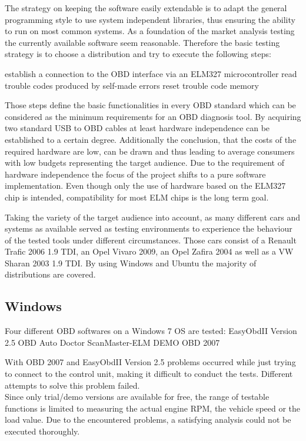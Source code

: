 The strategy on keeping the software easily extendable is to adapt the general programming style to use system independent libraries, thus 
ensuring the ability to run on most common systems. As a foundation of the market analysis testing the currently available software seem reasonable. 
Therefore the basic testing strategy is to choose a distribution and try to execute the following steps:

establish a connection to the OBD interface via an ELM327 microcontroller 
read trouble codes produced by self-made errors
reset trouble code memory

Those steps define the basic functionalities in every OBD standard which can be considered as the minimum requirements for an OBD diagnosis tool.
By acquiring two standard USB to OBD cables at least hardware independence can be established to a certain degree. Additionally the conclusion, that 
the costs of the required hardware are low, can be drawn and thus leading to average consumers with low budgets representing the target audience. Due
to the requirement of hardware independence the focus of the project shifts to a pure software implementation. Even though only the use of hardware 
based on the ELM327 chip is intended, compatibility for most ELM chips is the long term goal. 

Taking the variety of the target audience into account, as many different cars and systems as available served as testing environments to experience 
the behaviour of the tested tools under different circumstances. Those cars consist of a Renault Trafic 2006 1.9 TDI, an Opel Vivaro 2009, 
an Opel Zafira 2004 as well as a VW Sharan 2003 1.9 TDI. By using Windows and Ubuntu the majority of distributions are covered.

\subsection{Windows}
Four different OBD softwares on a Windows 7 OS are tested:
EasyObdII Version 2.5
OBD Auto Doctor
ScanMaster-ELM DEMO
OBD 2007

With OBD 2007 and EasyObdII Version 2.5 problems occurred while just trying to connect to the control unit, making it difficult to conduct the tests. 
Different attempts to solve this problem failed.\\
Since only trial/demo versions are available for free, the range of testable functions is limited to measuring the actual engine RPM, the vehicle 
speed or the load value. Due to the encountered problems, a satisfying analysis could not be executed thoroughly.
